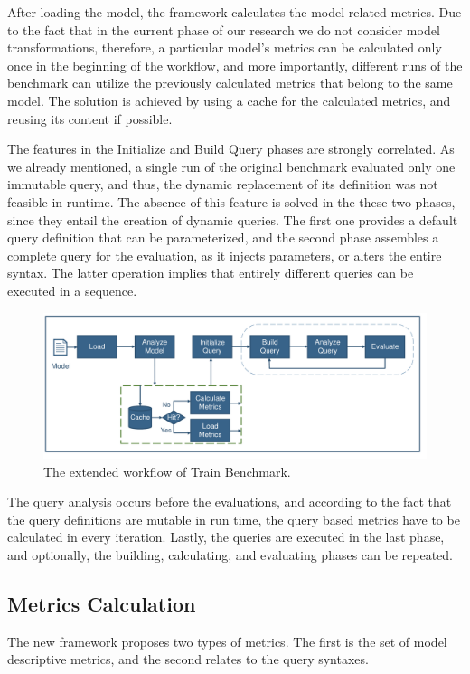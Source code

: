 After loading the model, the framework calculates the model related metrics. Due to the fact that in the current phase of our research we do not consider model transformations, therefore, a particular model's metrics can be calculated only once in the beginning of the workflow, and more importantly, different runs of the benchmark can utilize the previously calculated metrics that belong to the same model. The solution is achieved by using a cache for the calculated metrics, and reusing its content if possible.

The features in the \textsf{Initialize} and \textsf{Build Query} phases are strongly correlated. As we already mentioned, a single run of the original benchmark evaluated only one immutable query, and thus, the dynamic replacement of its definition was not feasible in runtime. The absence of this feature is solved in the these two phases, since they entail the creation of dynamic queries. The first one provides a default query definition that can be parameterized, and the second phase assembles a complete query for the evaluation, as it injects parameters, or alters the entire syntax. The latter operation implies that entirely different queries can be executed in a sequence.

\begin{figure}[!ht]
	\centering
	\includegraphics[width=150mm, keepaspectratio]{figures/workflow.pdf}
	\caption{The extended workflow of Train Benchmark.}
	\label{fig:new_train_workflow}
\end{figure}

The query analysis occurs before the evaluations, and according to the fact that the query definitions are mutable in run time, the query based metrics have to be calculated in every iteration. Lastly, the queries are executed in the last phase, and optionally, the building, calculating, and evaluating phases can be repeated.

\subsection{Metrics Calculation}
The new framework proposes two types of metrics. The first is the set of model descriptive metrics, and the second relates to the query syntaxes. 

